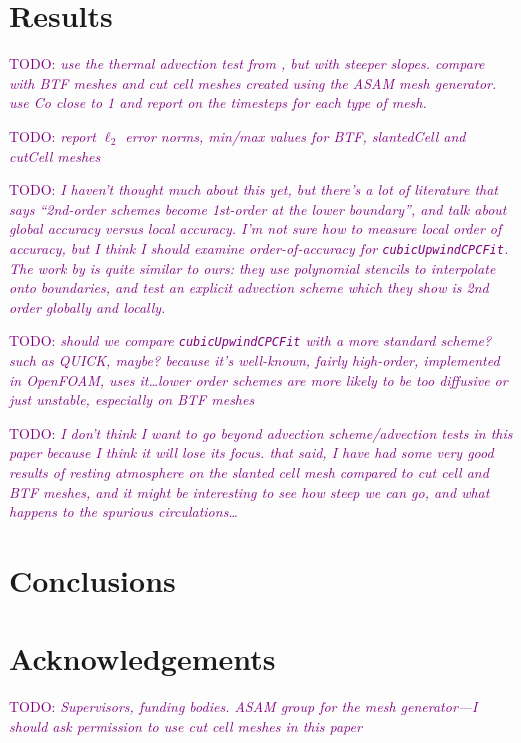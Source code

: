 \documentclass{article}
\newcommand{\TODO}[1]{\textcolor{purple}{TODO: \emph{#1}}}
\begin{document}
\section{Results}
\TODO{use the thermal advection test from \citet{shaw-weller2016}, but with steeper slopes.  compare with BTF meshes and cut cell meshes created using the ASAM mesh generator.  use Co close to 1 and report on the timesteps for each type of mesh.}

\TODO{report $\ell_2$ error norms, min/max values for BTF, slantedCell and cutCell meshes}

\TODO{I haven't thought much about this yet, but there's a lot of literature that says ``2nd-order schemes become 1st-order at the lower boundary'', and talk about global accuracy versus local accuracy.  I'm not sure how to measure local order of accuracy, but I think I should examine order-of-accuracy for \texttt{cubicUpwindCPCFit}.  The work by \citet{ye1999} is quite similar to ours: they use polynomial stencils to interpolate onto boundaries, and test an explicit advection scheme which they show is 2nd order globally and locally.}

\TODO{should we compare \texttt{cubicUpwindCPCFit} with a more standard scheme?  such as QUICK, maybe?  because it's well-known, fairly high-order, implemented in OpenFOAM, \citet{kirkpatrick2003} uses it\ldots  lower order schemes are more likely to be too diffusive or just unstable, especially on BTF meshes}

\TODO{I don't think I want to go beyond advection scheme/advection tests in this paper because I think it will lose its focus.  that said, I have had some very good results of resting atmosphere on the slanted cell mesh compared to cut cell and BTF meshes, and it might be interesting to see how steep we can go, and what happens to the spurious circulations\ldots}

\section{Conclusions}


\section{Acknowledgements}
\TODO{Supervisors, funding bodies.  ASAM group for the mesh generator---I should ask permission to use cut cell meshes in this paper}



\end{document}

